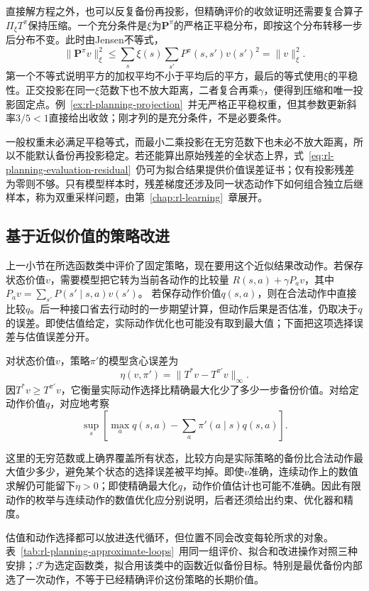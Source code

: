 直接解方程之外，也可以反复备份再投影，但精确评价的收敛证明还需要复合算子$\Pi_\xi T^\pi$保持压缩。一个充分条件是$\xi$为$\bm P^\pi$的严格正平稳分布，即按这个分布转移一步后分布不变。此时由Jensen不等式，
\[
 \lVert\bm P^\pi v\rVert_\xi^2
 \leq\sum_s\xi(s)\sum_{s'}P^\pi(s,s')v(s')^2
 =\lVert v\rVert_\xi^2.
\]
第一个不等式说明平方的加权平均不小于平均后的平方，最后的等式使用$\xi$的平稳性。正交投影在同一$\xi$范数下也不放大距离，二者复合再乘$\gamma$，便得到压缩和唯一投影固定点。例~\ref{ex:rl-planning-projection}~并无严格正平稳权重，但其参数更新斜率$3/5<1$直接给出收敛；刚才列的是充分条件，不是必要条件。

一般权重未必满足平稳等式，而最小二乘投影在无穷范数下也未必不放大距离，所以不能默认备份再投影稳定。若还能算出原始残差的全状态上界，式~\eqref{eq:rl-planning-evaluation-residual}~仍可为拟合结果提供价值误差证书；仅有投影残差为零则不够。只有模型样本时，残差梯度还涉及同一状态动作下如何组合独立后继样本，称为双重采样问题，由第~\ref{chap:rl-learning}~章展开。

\subsection{基于近似价值的策略改进}
\label{sec:rl-planning-approximate-improvement}

上一小节在所选函数类中评价了固定策略，现在要用这个近似结果改动作。若保存状态价值$v$，需要模型把它转为当前各动作的比较量
$R(s,a)+\gamma P_av$，其中$P_av=\sum_{s'}P(s'\mid s,a)v(s')$。
若保存动作价值$q(s,a)$，则在合法动作中直接比较$q$。后一种接口省去行动时的一步期望计算，但动作后果是否估准，仍取决于$q$的误差。即使估值给定，实际动作优化也可能没有取到最大值；下面把这项选择误差与估值误差分开。

\begin{definition}[近似贪心误差]
 \label{def:rl-planning-greedy-error}
 对状态价值$v$，策略$\pi'$的模型贪心误差为
 \[
 \eta(v,\pi')=\lVert T^*v-T^{\pi'}v\rVert_\infty.
 \]
 因$T^*v\geq T^{\pi'}v$，它衡量实际动作选择比精确最大化少了多少一步备份价值。对给定动作价值$q$，对应地考察
 \[
  \sup_s\left[\max_a q(s,a)-\sum_a\pi'(a\mid s)q(s,a)\right].
 \]
\end{definition}

这里的无穷范数或上确界覆盖所有状态，比较方向是实际策略的备份比合法动作最大值少多少，避免某个状态的选择误差被平均掉。即使$v$准确，连续动作上的数值求解仍可能留下$\eta>0$；即使精确最大化$q$，动作价值估计也可能不准确。因此有限动作的枚举与连续动作的数值优化应分别说明，后者还须给出约束、优化器和精度。

估值和动作选择都可以放进迭代循环，但位置不同会改变每轮所求的对象。表~\ref{tab:rl-planning-approximate-loops}~用同一组评价、拟合和改进操作对照三种安排；$\mathcal F$为选定函数类，拟合用该类中的函数近似备份目标。特别是最优备份内部选了一次动作，不等于已经精确评价这份策略的长期价值。

